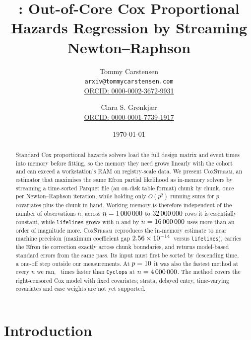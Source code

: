\documentclass[11pt,a4paper]{article}
\title{\coxstream: Out-of-Core Cox Proportional Hazards
       Regression by Streaming Newton--Raphson}
\author{Tommy Carstensen\\
        \small \texttt{arxiv@tommycarstensen.com}\\[2pt]
        \small \href{https://orcid.org/0000-0002-3672-9931}
                    {ORCID: 0000-0002-3672-9931}
        \and
        Clara S. Gr{\o}nkj{\ae}r\\[2pt]
        \small \href{https://orcid.org/0000-0001-7739-1917}
                    {ORCID: 0000-0001-7739-1917}}
\date{\today}
\newcommand{\coxstream}{\textsc{CoxStream}}
\begin{document}
\maketitle

\begin{abstract}
Standard Cox proportional hazards solvers load the full design matrix
and event times into memory before fitting, so the memory they need grows
linearly with the cohort and can exceed a workstation's RAM on registry-scale
data. We
present \coxstream, an estimator that maximises the same Efron partial
likelihood as in-memory solvers by streaming a time-sorted Parquet file (an
on-disk table format) chunk by chunk, once per Newton--Raphson iteration, while
holding only $O(p^2)$ running sums for $p$ covariates plus the chunk in hand.
Working memory is therefore
independent of the number of observations $n$: across $n = 1\,000\,000$ to
$32\,000\,000$ rows it is essentially constant, while \texttt{lifelines}
grows with $n$ and by $n = 16\,000\,000$ uses more than an order of magnitude
more. \coxstream\ reproduces the in-memory estimate to near machine precision
(maximum coefficient gap $2.56 \times 10^{-14}$\ versus \texttt{lifelines}),
carries the Efron tie correction exactly across chunk boundaries, and returns
model-based standard errors from the same pass. Its input must first be sorted
by descending time, a one-off step outside our measurements. At $p =
10$ it was also the fastest method at every $n$ we ran,
\CoxStreamVsCyclopsSpeedup\ times faster than \texttt{Cyclops} at $n =
4\,000\,000$. The method covers the right-censored Cox model with fixed
covariates; strata, delayed entry, time-varying covariates and case weights
are not yet supported.
\end{abstract}

\section{Introduction}
\label{sec:intro}
\end{document}

